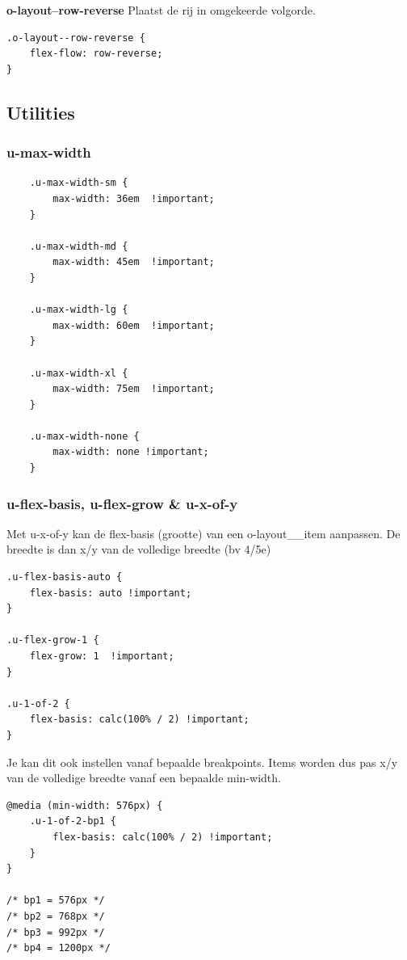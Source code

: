\documentclass{article}
\newcommand{\bold}[1]{\textbf{#1}}
\begin{document}
\bold{o-layout--row-reverse}
Plaatst de rij in omgekeerde volgorde.

\begin{lstlisting}
.o-layout--row-reverse {
    flex-flow: row-reverse;
}
\end{lstlisting}

\subsection{Utilities}

\subsubsection{u-max-width}

\begin{lstlisting}
    .u-max-width-sm {
        max-width: 36em  !important;
    }
    
    .u-max-width-md {
        max-width: 45em  !important;
    }
    
    .u-max-width-lg {
        max-width: 60em  !important;
    }
    
    .u-max-width-xl {
        max-width: 75em  !important;
    }
    
    .u-max-width-none {
        max-width: none !important;
    }
\end{lstlisting}

\subsubsection{u-flex-basis, u-flex-grow \& u-x-of-y}

Met u-x-of-y kan de flex-basis (grootte) van een o-layout\_\_item aanpassen. De breedte is dan x/y van de volledige breedte (bv 4/5e)

\begin{lstlisting}
.u-flex-basis-auto {
    flex-basis: auto !important;
}

.u-flex-grow-1 {
    flex-grow: 1  !important;
}

.u-1-of-2 {
    flex-basis: calc(100% / 2) !important;
}
\end{lstlisting}

Je kan dit ook instellen vanaf bepaalde breakpoints. Items worden dus pas x/y van de volledige breedte vanaf een bepaalde min-width.

\begin{lstlisting}
@media (min-width: 576px) {
    .u-1-of-2-bp1 {
        flex-basis: calc(100% / 2) !important;
    }
}

/* bp1 = 576px */
/* bp2 = 768px */
/* bp3 = 992px */
/* bp4 = 1200px */
\end{lstlisting}
\end{document}
